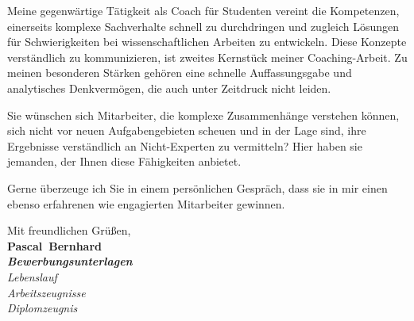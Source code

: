 \documentclass[11pt,a4paper]{article}
\def\firstname{Pascal}
\def\familyname{Bernhard}
\begin{document}
Meine gegenwärtige Tätigkeit als Coach für Studenten vereint die Kompetenzen, einerseits komplexe Sachverhalte schnell zu durchdringen und zugleich Lösungen für Schwierigkeiten bei wissenschaftlichen Arbeiten zu entwickeln. Diese Konzepte verständlich zu kommunizieren, ist zweites Kernstück meiner Coaching-Arbeit. Zu meinen besonderen Stärken gehören eine schnelle Auffassungsgabe und analytisches Denkvermögen, die auch unter Zeitdruck nicht leiden.

Sie wünschen sich Mitarbeiter, die komplexe Zusammenhänge verstehen können, sich nicht vor neuen Aufgabengebieten scheuen und in der Lage sind, ihre Ergebnisse verständlich an Nicht-Experten zu vermitteln? Hier haben sie jemanden, der Ihnen diese Fähigkeiten anbietet.

Gerne überzeuge ich Sie in einem persönlichen Gespräch, dass sie in mir einen ebenso erfahrenen wie engagierten Mitarbeiter gewinnen.



  
Mit freundlichen Grüßen,\\[3em] %
%
{\bfseries \firstname~\familyname}\\
%
\vfill%
{\slshape \bfseries Bewerbungsunterlagen}\\
 {\slshape Lebenslauf\\
 Arbeitszeugnisse\\
 Diplomzeugnis{}}
\end{document}

